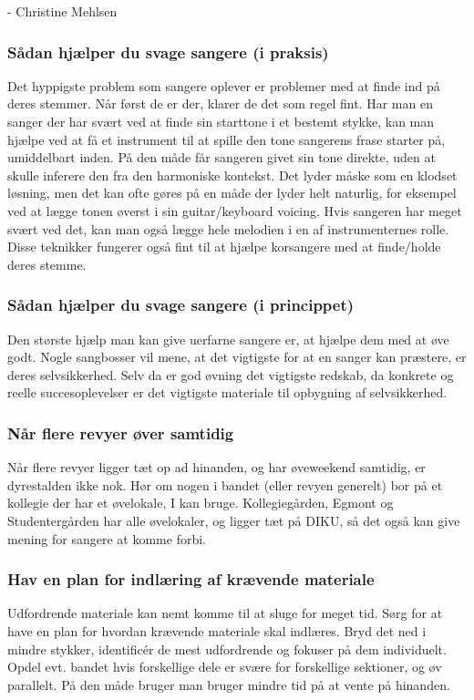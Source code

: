 - Christine Mehlsen

\subsubsection{Sådan hjælper du svage sangere (i praksis)}
Det hyppigste problem som sangere oplever er problemer med at finde ind på deres stemmer. Når først de er der, klarer de det som regel fint.
Har man en sanger der har svært ved at finde sin starttone i et bestemt stykke, kan man hjælpe ved at få et instrument til at spille den tone sangerens frase starter på, umiddelbart inden. På den måde får sangeren givet sin tone direkte, uden at skulle inferere den fra den harmoniske kontekst.
Det lyder måske som en klodset løsning, men det kan ofte gøres på en måde der lyder helt naturlig, for eksempel ved at lægge tonen øverst i sin guitar/keyboard voicing.
Hvis sangeren har meget svært ved det, kan man også lægge hele melodien i en af instrumenternes rolle.
Disse teknikker fungerer også fint til at hjælpe korsangere med at finde/holde deres stemme.

\subsubsection{Sådan hjælper du svage sangere (i princippet)}
Den største hjælp man kan give uerfarne sangere er, at hjælpe dem med at øve godt.
Nogle sangbosser vil mene, at det vigtigste for at en sanger kan præstere, er deres selvsikkerhed.
Selv da er god øvning det vigtigste redskab, da konkrete og reelle succesoplevelser er det vigtigste materiale til opbygning af selvsikkerhed.

\subsubsection{Når flere revyer øver samtidig}
Når flere revyer ligger tæt op ad hinanden, og har øveweekend samtidig, er dyrestalden ikke nok. Hør om nogen i bandet (eller revyen generelt) bor på et kollegie der har et øvelokale, I kan bruge. Kollegiegården, Egmont og Studentergården har alle øvelokaler, og ligger tæt på DIKU, så det også kan give mening for sangere at komme forbi.

\subsubsection{Hav en plan for indlæring af krævende materiale}
Udfordrende materiale kan nemt komme til at sluge for meget tid. Sørg for at have en plan for hvordan krævende materiale skal indlæres. Bryd det ned i mindre stykker, identificér de mest udfordrende og fokuser på dem individuelt. Opdel evt. bandet hvis forskellige dele er svære for forskellige sektioner, og øv parallelt. På den måde bruger man bruger mindre tid på at vente på hinanden.

